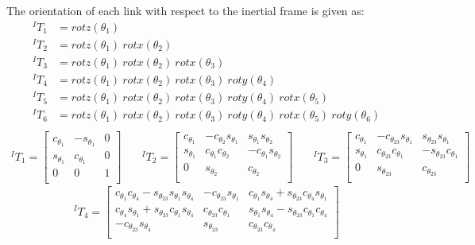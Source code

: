 \documentclass[12pt]{report}
\begin{document}
\newpage
The orientation of each link with respect to the inertial frame is given as:
\[
\begin{aligned}
^IT_1 &= rotz(\theta_1) \\
^IT_2 &= rotz(\theta_1)~rotx(\theta_2)\\
^IT_3 &= rotz(\theta_1)~rotx(\theta_2)~rotx(\theta_3)\\
^IT_4 &= rotz(\theta_1)~rotx(\theta_2)~rotx(\theta_3)~roty(\theta_4)\\
^IT_5 &= rotz(\theta_1)~rotx(\theta_2)~rotx(\theta_3)~roty(\theta_4)~rotx(\theta_5)\\
^IT_6 &= rotz(\theta_1)~rotx(\theta_2)~rotx(\theta_3)~roty(\theta_4)~rotx(\theta_5)~roty(\theta_6)\\
\end{aligned}
\]
\[
\begin{aligned}
  ^IT_1 =
  \begin{bmatrix}
    c_{\theta_1}& -s_{\theta_1}& 0\\
    s_{\theta_1}&  c_{\theta_1}& 0\\
    0&            0& 1\\
  \end{bmatrix} & \quad
  ^IT_2 =
  \begin{bmatrix}
    c_{\theta_1}& -c_{\theta_2}s_{\theta_1}&  s_{\theta_1}s_{\theta_2}\\
    s_{\theta_1}&  c_{\theta_1}c_{\theta_2}& -c_{\theta_1}s_{\theta_2}\\
    0&              s_{\theta_2}&              c_{\theta_2}\\
  \end{bmatrix} & \quad
  ^IT_3 =
  \begin{bmatrix}
    c_{\theta_1}& -c_{\theta_{23}}s_{\theta_1}&  s_{\theta_{23}}s_{\theta_1}\\
    s_{\theta_1}&  c_{\theta_{23}}c_{\theta_1}& -s_{\theta_{23}}c_{\theta_1}\\
    0&              s_{\theta_{23}}&              c_{\theta_{23}}\\
  \end{bmatrix}
\end{aligned}
\]
\[
^IT_4 =
\begin{bmatrix}
c_{\theta_1}c_{\theta_4} - s_{\theta_{23}}s_{\theta_1}s_{\theta_4}& -c_{\theta_{23}}s_{\theta_1}& c_{\theta_1}s_{\theta_4} + s_{\theta_{23}}c_{\theta_4}s_{\theta_1}\\
c_{\theta_4}s_{\theta_1} + s_{\theta_{23}}c_{\theta_1}s_{\theta_4}&  c_{\theta_{23}}c_{\theta_1}& s_{\theta_1}s_{\theta_4} - s_{\theta_{23}}c_{\theta_1}c_{\theta_4}\\
-c_{\theta_{23}}s_{\theta_4}&              s_{\theta_{23}}&                                       c_{\theta_{23}}c_{\theta_4}\\
\end{bmatrix}
\]
\end{document}
